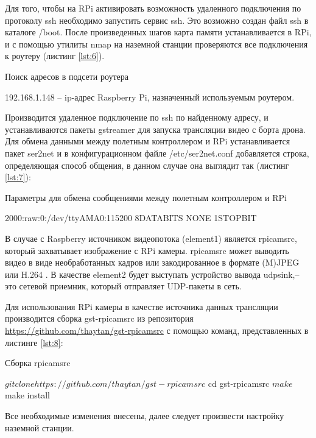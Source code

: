 Для того, чтобы на RPi активировать возможность удаленного подключения по протоколу ssh необходимо запустить сервис ssh. Это возможно %
создан файл ssh в каталоге /boot.
После произведенных шагов карта памяти устанавливается в RPi, и с помощью утилиты nmap на наземной станции проверяются все подключения к роутеру (листинг \ref{lst:6}).
\begin{Program}[H]
	\caption{Поиск адресов в подсети роутера} \label{lst:6}
\end{Program}

192.168.1.148 -- ip-адрес Raspberry Pi, назначенный используемым роутером.

Производится удаленное подключение по ssh по найденному адресу, и устанавливаются пакеты gstreamer для запуска трансляции видео с борта дрона.
Для обмена данными между полетным контроллером и RPi устанавливается пакет ser2net и в конфигурационном файле /etc/ser2net.conf добавляется строка, определяющая способ общения, в данном случае она выглядит так (листинг \ref{lst:7}):
\begin{Program}[H]
\caption{Параметры для обмена сообщениями между полетным контроллером и RPi} \label{lst:7}
	\begin{MyCode}
	2000:raw:0:/dev/ttyAMA0:115200 8DATABITS NONE 1STOPBIT
	\end{MyCode}
\end{Program}

В случае с Raspberry источником видеопотока (element1) является rpi\-cam\-src, который захватывает изображение с RPi камеры. rpi\-cam\-src может выводить видео в виде необработанных кадров или закодированное в формате (M)JPEG или H.264 \cite{gstreamer1}. В качестве element2 будет выступать устройство вывода udpsink,-- это сетевой приемник, который отправляет UDP-пакеты в сеть.

Для использования RPi камеры в качестве источника данных трансляции производится сборка gst-rpicamsrc из репозитория \url{https://github.com/thaytan/gst-rpicamsrc} с помощью команд, представленных в листинге \ref{lst:8}:
\begin{Program}[H]
\caption{Сборка rpicamsrc} \label{lst:8}
	\begin{MyCode}
	$ git clone https://github.com/thaytan/gst-rpicamsrc
	$ cd gst-rpicamsrc
	$ make
	$ make install
	\end{MyCode}
\end{Program}


Все необходимые изменения внесены, далее следует произвести настройку наземной станции.

